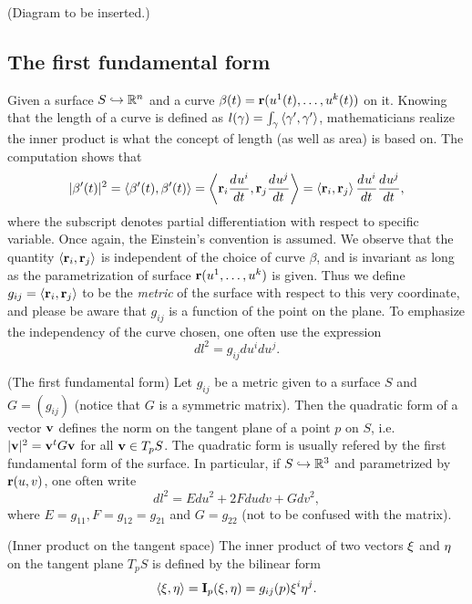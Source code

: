 (Diagram to be inserted.)

\subsection{The first fundamental form}
Given a surface $S \hookrightarrow \mathbb{R}^n$ and a curve $\beta(t) = \mathbf{r}(u^1(t), \dots, u^k(t))$ on it. Knowing that the length of a curve is defined as $l(\gamma) = \int_{\gamma} \left< \gamma', \gamma' \right>$, mathematicians realize the inner product is what the concept of length (as well as area) is based on. The computation shows that
\[|\beta'(t)|^2 = \left< \beta'(t), \beta'(t) \right> = \left< \mathbf{r}_i\frac{d^{} u^i}{d t^{}}, \mathbf{r}_j\frac{d^{} u^j}{d t^{}} \right> = \left< \mathbf{r}_i, \mathbf{r}_j \right>\frac{d^{} u^i}{d t^{}} \frac{d^{} u^j}{d t^{}},\]
where the subscript denotes partial differentiation with respect to specific variable. Once again, the Einstein's convention is assumed. We observe that the quantity $\left< \mathbf{r}_i, \mathbf{r}_j \right>$ is independent of the choice of curve $\beta$, and is invariant as long as the parametrization of surface $\mathbf{r}(u^1, \dots, u^k)$ is given. Thus we define $g_{ij} = \left< \mathbf{r}_i, \mathbf{r}_j \right>$ to be the \emph{metric} of the surface with respect to this very coordinate, and please be aware that $g_{ij}$ is a function of the point on the plane. To emphasize the independency of the curve chosen, one often use the expression
\[ dl^2 = g_{ij} du^i du^j. \]

\begin{definition}
	(The first fundamental form) Let $g_{ij}$ be a metric given to a surface $S$ and $G = (g_{ij})$ (notice that $G$ is a symmetric matrix). Then the quadratic form of a vector $\mathbf{v}$ defines the norm on the tangent plane of a point $p$ on $S$, i.e. $|\mathbf{v}|^2 = \mathbf{v}^t G \mathbf{v}$ for all $\mathbf{v} \in T_pS$. The quadratic form is usually refered by the first fundamental form of the surface. In particular, if $S \hookrightarrow \mathbb{R}^3$ and parametrized by $\mathbf{r}(u, v)$, one often write \[dl^2 = Edu^2 + 2Fdudv + Gdv^2,\] where $E = g_{11}, F = g_{12} = g_{21}$ and $G = g_{22}$ (not to be confused with the matrix).
\end{definition}

\begin{definition}
	(Inner product on the tangent space) The inner product of two vectors $\mathbf{\xi}$ and $\mathbf{\eta}$ on the tangent plane $T_pS$ is defined by the bilinear form \[ \left< \mathbf{\xi}, \mathbf{\eta} \right>= \mathbf{I}_{p}(\mathbf{\xi}, \mathbf{\eta}) = g_{ij}(p) \mathbf{\xi}^i \mathbf{\eta}^j. \]
\end{definition}

